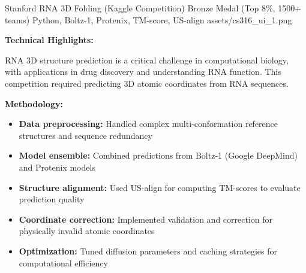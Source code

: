 
\ProjectEntry
{Stanford RNA 3D Folding (Kaggle Competition)}
{Bronze Medal (Top 8\%, 1500+ teams)}
{Python, Boltz-1, Protenix, TM-score, US-align}
{
}
{assets/cs316_ui_1.png}
{ \quad {}}
{   }

\vspace{1em}

\textbf{Technical Highlights:}

RNA 3D structure prediction is a critical challenge in computational biology, with applications in drug discovery and understanding RNA function. This competition required predicting 3D atomic coordinates from RNA sequences.

\textbf{Methodology:}
\begin{itemize}[leftmargin=1.2em, itemsep=0.1em]
  \item \textbf{Data preprocessing:} Handled complex multi-conformation reference structures and sequence redundancy
  \item \textbf{Model ensemble:} Combined predictions from Boltz-1 (Google DeepMind) and Protenix models
  \item \textbf{Structure alignment:} Used US-align for computing TM-scores to evaluate prediction quality
  \item \textbf{Coordinate correction:} Implemented validation and correction for physically invalid atomic coordinates
  \item \textbf{Optimization:} Tuned diffusion parameters and caching strategies for computational efficiency
\end{itemize}

